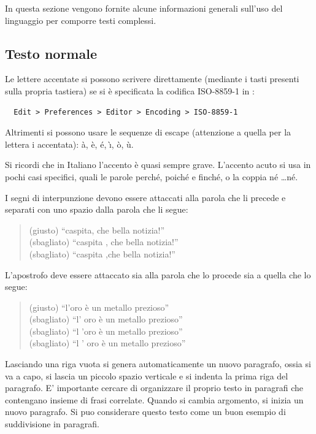 In questa sezione vengono fornite alcune informazioni generali sull'uso del linguaggio \ltx per comporre testi complessi.


\subsection{Testo normale}

Le lettere accentate si possono scrivere direttamente (mediante i tasti presenti sulla propria tastiera) se si è specificata la codifica ISO-8859-1 in \mik:
\begin{verbatim}
  Edit > Preferences > Editor > Encoding > ISO-8859-1
\end{verbatim}
Altrimenti si possono usare le sequenze di escape (attenzione a quella per la lettera i accentata):
\`a, \`e, \'e, \`{\i}, \`o, \`u.

Si ricordi che in Italiano l'accento è quasi sempre grave. L'accento acuto si usa in pochi casi specifici, quali le parole perché, poiché e finché, o la coppia né \ldots né.

I segni di interpunzione devono essere attaccati alla parola che li precede e separati con uno spazio dalla parola che li segue:
\begin{quote}
(giusto) ``caspita, che bella notizia!''
\\
(sbagliato) ``caspita , che bella notizia!''
\\
(sbagliato) ``caspita ,che bella notizia!''
\end{quote}

L'apostrofo deve essere attaccato sia alla parola che lo procede sia a quella che lo segue:
\begin{quote}
(giusto) ``l'oro è un metallo prezioso''
\\
(sbagliato) ``l' oro è un metallo prezioso''
\\
(sbagliato) ``l 'oro è un metallo prezioso''
\\
(sbagliato) ``l ' oro è un metallo prezioso''
\end{quote}

Lasciando una riga vuota si genera automaticamente un nuovo paragrafo, ossia si va a capo, si lascia un piccolo spazio verticale e si indenta la prima riga del paragrafo.
E' importante cercare di organizzare il proprio testo in paragrafi che contengano insieme di frasi correlate. Quando si cambia argomento, si inizia un nuovo paragrafo. Si puo considerare questo testo come un buon esempio di suddivisione in paragrafi.


